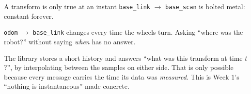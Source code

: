 \documentclass[aspectratio=169]{beamer}
\begin{document}
\begin{frame}{A transform is only true at an instant}
  \small
  \texttt{base\_link} $\rightarrow$ \texttt{base\_scan} is bolted metal: constant forever.

  \vspace{0.4em}
  \texttt{odom} $\rightarrow$ \texttt{base\_link} changes every time the wheels turn. Asking
  ``where was the robot?'' without saying \emph{when} has no answer.

  \vspace{0.7em}
  \begin{center}
  \end{center}

  \vspace{0.4em}
  \begin{underhood}
    \footnotesize
    The library stores a short history and answers ``what was this transform at time $t$?'', by
    interpolating between the samples on either side. That is only possible because every
    message carries the time its data was \emph{measured}. This is Week 1's ``nothing is
    instantaneous'' made concrete.
  \end{underhood}
\end{frame}
\end{document}
